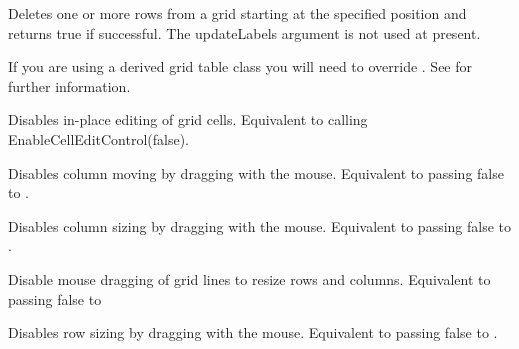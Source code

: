 Deletes one or more rows from a grid starting at the specified position and returns
true if successful. The updateLabels argument is not used at present.

If you are using a derived grid table class you will need to override
. See
 for further information.



\label{wxgriddisablecelleditcontrol}


Disables in-place editing of grid cells.
Equivalent to calling EnableCellEditControl(false).



\label{wxgriddisabledragcolmove}


Disables column moving by dragging with the mouse. Equivalent to passing false to
.



\label{wxgriddisabledragcolsize}


Disables column sizing by dragging with the mouse. Equivalent to passing false to
.



\label{wxgriddisabledraggridsize}


Disable mouse dragging of grid lines to resize rows and columns. Equivalent to passing
false to 



\label{wxgriddisabledragrowsize}


Disables row sizing by dragging with the mouse. Equivalent to passing false to
.



\label{wxgridenablecelleditcontrol}

